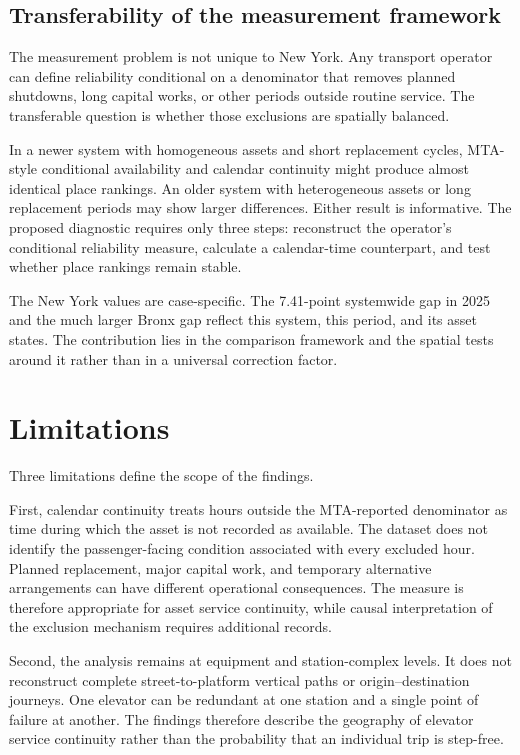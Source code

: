 \subsection{Transferability of the measurement framework}

The measurement problem is not unique to New York. Any transport operator can define reliability conditional on a denominator that removes planned shutdowns, long capital works, or other periods outside routine service. The transferable question is whether those exclusions are spatially balanced.

In a newer system with homogeneous assets and short replacement cycles, MTA-style conditional availability and calendar continuity might produce almost identical place rankings. An older system with heterogeneous assets or long replacement periods may show larger differences. Either result is informative. The proposed diagnostic requires only three steps: reconstruct the operator's conditional reliability measure, calculate a calendar-time counterpart, and test whether place rankings remain stable.

The New York values are case-specific. The 7.41-point systemwide gap in 2025 and the much larger Bronx gap reflect this system, this period, and its asset states. The contribution lies in the comparison framework and the spatial tests around it rather than in a universal correction factor.

\section{Limitations}

Three limitations define the scope of the findings.

First, calendar continuity treats hours outside the MTA-reported denominator as time during which the asset is not recorded as available. The dataset does not identify the passenger-facing condition associated with every excluded hour. Planned replacement, major capital work, and temporary alternative arrangements can have different operational consequences. The measure is therefore appropriate for asset service continuity, while causal interpretation of the exclusion mechanism requires additional records.

Second, the analysis remains at equipment and station-complex levels. It does not reconstruct complete street-to-platform vertical paths or origin--destination journeys. One elevator can be redundant at one station and a single point of failure at another. The findings therefore describe the geography of elevator service continuity rather than the probability that an individual trip is step-free.

